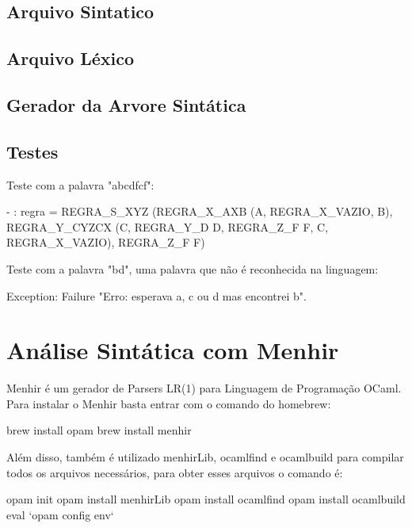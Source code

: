 \documentclass[12pt,a4paper,twoside]{report}
\begin{document}
\subsection{Arquivo Sintatico}

\subsection{Arquivo Léxico}

\subsection{Gerador da Arvore Sintática}

\subsection{Testes}
Teste com a palavra "abcdfcf":
\begin{terminal}
- : regra =
REGRA_S_XYZ (REGRA_X_AXB (A, REGRA_X_VAZIO, B),
 REGRA_Y_CYZCX (C, REGRA_Y_D D, REGRA_Z_F F, C, REGRA_X_VAZIO), REGRA_Z_F F)
 \end{terminal}

Teste com a palavra "bd", uma palavra que não é reconhecida na linguagem:

\begin{terminal}
Exception: Failure "Erro: esperava a, c ou d mas encontrei b".
 \end{terminal}

 \section{Análise Sintática com Menhir}

 Menhir é um gerador de Parsers LR(1) para Linguagem de Programação OCaml. Para instalar o Menhir basta entrar com o comando do homebrew:

 \begin{terminal}
brew install opam
brew install menhir
 \end{terminal}

 Além disso, também é utilizado menhirLib, ocamlfind e ocamlbuild para compilar todos os arquivos necessários, para obter esses arquivos o comando é:

 \begin{terminal}
opam init
opam install menhirLib
opam install ocamlfind
opam install ocamlbuild
eval `opam config env`
 \end{terminal}
\end{document}
